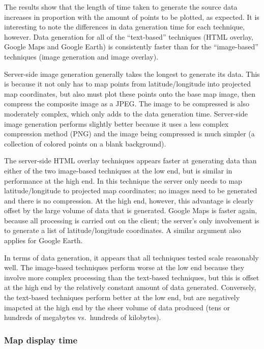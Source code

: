 \documentclass[acmtocl,acmnow]{acmtrans2m}
\begin{document}
The results show that the length of time taken to generate the source
data increases in proportion with the amount of points to be plotted, as
expected. It is interesting to note the differences in data generation
time for each technique, however. Data generation for all of the
``text-based'' techniques (HTML overlay, Google Maps and Google Earth)
is consistently faster than for the ``image-based'' techniques (image
generation and image overlay).

Server-side image generation generally takes the longest to generate its
data. This is because it not only has to map points from
latitude/longitude into projected map coordinates, but also must plot
these points onto the base map image, then compress the composite image
as a JPEG. The image to be compressed is also moderately complex, which
only adds to the data generation time. Server-side image generation
performs slightly better because it uses a less complex compression
method (PNG) and the image being compressed is much simpler (a
collection of colored points on a blank background).

The server-side HTML overlay techniques appears faster at generating
data than either of the two image-based techniques at the low end, but
is similar in performance at the high end. In this technique the server
only needs to map latitude/longitude to projected map coordinates; no
images need to be generated and there is no compression. At the high
end, however, this advantage is clearly offset by the large volume of
data that is generated. Google Maps is faster again, because all
processing is carried out on the client; the server's only involvement
is to generate a list of latitude/longitude coordinates. A similar
argument also applies for Google Earth.

In terms of data generation, it appears that all techniques tested scale
reasonably well. The image-based techniques perform worse at the low end
because they involve more complex processing than the text-based
techniques, but this is offset at the high end by the relatively
constant amount of data generated. Conversely, the text-based techniques
perform better at the low end, but are negatively imapcted at the high
end by the sheer volume of data produced (tens or hundreds of megabytes
vs.\ hundreds of kilobytes).


\subsubsection{Map display time}
\end{document}
